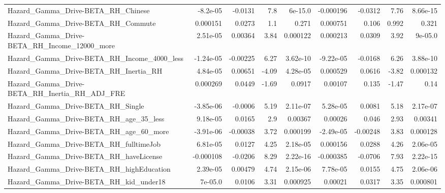 \begin{tabular}{lrrrrrrrr}
Hazard\_Gamma\_Drive-BETA\_RH\_Chinese                 &    -8.2e-05 &      -0.0131 &      7.8 &  6e-15.0 &  -0.000196 &     -0.0312 &         7.76 &      8.66e-15 \\
Hazard\_Gamma\_Drive-BETA\_RH\_Commute                 &    0.000151 &       0.0273 &      1.1 &    0.271 &   0.000751 &       0.106 &        0.992 &         0.321 \\
Hazard\_Gamma\_Drive-BETA\_RH\_Income\_12000\_more       &    2.51e-05 &      0.00364 &     3.84 & 0.000122 &   0.000213 &      0.0309 &         3.92 &       9e-05.0 \\
Hazard\_Gamma\_Drive-BETA\_RH\_Income\_4000\_less        &   -1.24e-05 &     -0.00225 &     6.27 & 3.62e-10 &  -9.22e-05 &     -0.0168 &         6.26 &      3.88e-10 \\
Hazard\_Gamma\_Drive-BETA\_RH\_Inertia\_RH              &    4.84e-05 &      0.00651 &    -4.09 & 4.28e-05 &   0.000529 &      0.0616 &        -3.82 &      0.000132 \\
Hazard\_Gamma\_Drive-BETA\_RH\_Inertia\_RH\_ADJ\_FRE      &    0.000269 &       0.0449 &    -1.69 &   0.0917 &    0.00107 &       0.135 &        -1.47 &          0.14 \\
Hazard\_Gamma\_Drive-BETA\_RH\_Single                  &   -3.85e-06 &      -0.0006 &     5.19 & 2.11e-07 &   5.28e-05 &      0.0081 &         5.18 &      2.17e-07 \\
Hazard\_Gamma\_Drive-BETA\_RH\_age\_35\_less             &    9.18e-05 &       0.0165 &      2.9 &  0.00367 &    0.00026 &       0.046 &         2.93 &       0.00341 \\
Hazard\_Gamma\_Drive-BETA\_RH\_age\_60\_more             &   -3.91e-06 &     -0.00038 &     3.72 & 0.000199 &  -2.49e-05 &    -0.00248 &         3.83 &      0.000128 \\
Hazard\_Gamma\_Drive-BETA\_RH\_fulltimeJob             &    6.81e-05 &       0.0127 &     4.25 & 2.18e-05 &   0.000156 &      0.0288 &         4.26 &      2.06e-05 \\
Hazard\_Gamma\_Drive-BETA\_RH\_haveLicense             &   -0.000108 &      -0.0206 &     8.29 & 2.22e-16 &  -0.000385 &     -0.0706 &         7.93 &      2.22e-15 \\
Hazard\_Gamma\_Drive-BETA\_RH\_highEducation           &    2.39e-05 &      0.00479 &     4.74 & 2.15e-06 &   7.78e-05 &      0.0155 &         4.75 &      2.06e-06 \\
Hazard\_Gamma\_Drive-BETA\_RH\_kid\_under18             &     7e-05.0 &       0.0106 &     3.31 & 0.000925 &    0.00021 &      0.0317 &         3.35 &      0.000801 \\

\end{tabular}
